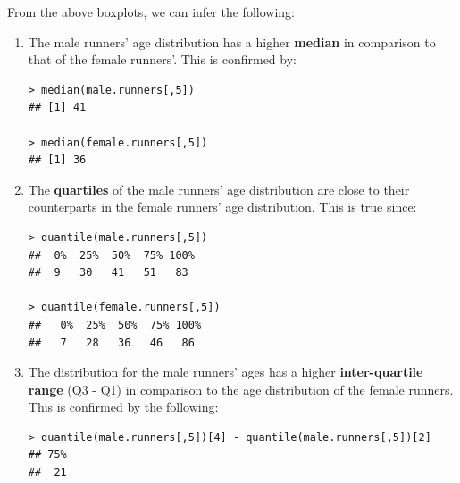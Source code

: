 \documentclass[12pt,letterpaper,titlepage,en-US]{article}
\begin{document}
From the above boxplots, we can infer the following:

\begin{enumerate}

\item The male runners' age distribution has a higher \textbf{median} in comparison to that of the female runners'. This is confirmed by:
\begin{knitrout}
\color{fgcolor}
\begin{kframe}

\begin{verbatim}
> median(male.runners[,5])
## [1] 41
 
> median(female.runners[,5])
## [1] 36
\end{verbatim}
\end{kframe}
\end{knitrout}



\item The \textbf{quartiles} of the male runners' age distribution are close to their counterparts in the female runners' age distribution. This is true since:

\begin{knitrout}
\color{fgcolor}
\begin{kframe}

\begin{verbatim}
> quantile(male.runners[,5])
##  0%  25%  50%  75% 100% 
##  9   30   41   51   83 
   
> quantile(female.runners[,5])
##   0%  25%  50%  75% 100% 
##   7   28   36   46   86 
\end{verbatim}
\end{kframe}
\end{knitrout}




\item  The distribution for the male runners' ages has a higher \textbf{inter-quartile range} (Q3 - Q1) in comparison to the age distribution of the female runners. This is confirmed by the following:

\begin{knitrout}
\color{fgcolor}
\begin{kframe}

\begin{verbatim}
> quantile(male.runners[,5])[4] - quantile(male.runners[,5])[2]
## 75% 
##  21 
 

\end{verbatim}
\end{kframe}
\end{knitrout}
\end{enumerate}
\end{document}
